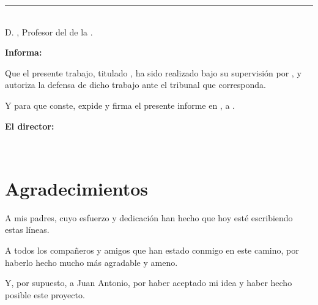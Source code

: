 \noindent\rule[-1ex]{\textwidth}{2pt}\\[4.5ex]

D. \textbf{\myProf}, Profesor del \textbf{\myDepartment} de la \textbf{\myUni}.

\vspace{0.5cm}

\textbf{Informa:}

\vspace{0.5cm}

Que el presente trabajo, titulado \textit{\textbf{\myTitle}}, ha sido realizado bajo su supervisión 
por \textbf{\myName}, y autoriza la defensa de dicho trabajo ante el tribunal que corresponda.

\vspace{0.5cm}

Y para que conste, expide y firma el presente informe en \myLocation, a \myTimeES.

\vspace{1cm}

\textbf{El director:}

\vspace{5cm}

\noindent \textbf{\myProf\\}

\chapter*{Agradecimientos}
\thispagestyle{empty}

       \vspace{1cm}

A mis padres, cuyo esfuerzo y dedicación han hecho que hoy esté escribiendo estas líneas.

\bigskip
A todos los compañeros y amigos que han estado conmigo en este camino, por haberlo hecho 
mucho más agradable y ameno.

\bigskip
Y, por supuesto, a Juan Antonio, por haber aceptado mi idea y haber hecho posible este proyecto.
